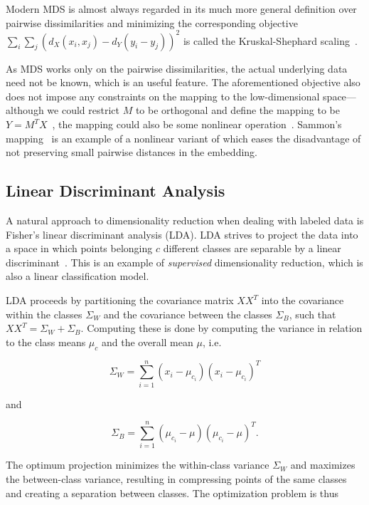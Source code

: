 Modern MDS is almost always regarded in its much more general definition over
pairwise dissimilarities and minimizing the corresponding objective $\sum_i \sum_j
(d_X (x_i, x_j) - d_Y (y_i - y_j))^2$ is called the Kruskal-Shephard scaling~\cite{linearsurvey,kruskal_mds}.

As MDS works only on the pairwise dissimilarities, the actual underlying data need not
be known, which is an useful feature. The aforementioned objective also does not impose
any constraints on the mapping to the low-dimensional space---although we could restrict $M$
to be orthogonal and define the mapping to be $Y = M^TX$~\cite{borg_groenen_mds, cox_mds}, the
mapping could also be some nonlinear operation~\cite{linearsurvey}. Sammon's mapping~\cite{sammon_mapping}
is an example of a nonlinear variant of which eases the disadvantage of not preserving small
pairwise distances in the embedding.

\subsection{Linear Discriminant Analysis}

A natural approach to dimensionality reduction when dealing with labeled data is Fisher's linear discriminant analysis (LDA).
LDA strives to project the data into a space in which points belonging $c$ different classes
are separable by a linear discriminant~\cite{bishop}. This is an example of \emph{supervised} dimensionality reduction,
which is also a linear classification model.

LDA proceeds by partitioning the covariance matrix $XX^T$ into the covariance within the classes $\Sigma_W$
and the covariance between the classes $\Sigma_B$, such that $XX^T = \Sigma_W + \Sigma_B$. Computing these
is done by computing the variance in relation to the class means $\mu_c$ and the overall mean $\mu$, i.e.

\begin{equation}
    \Sigma_W = \sum_{i=1}^{n} (x_i - \mu_{c_i})(x_i - \mu_{c_i})^T
\end{equation}

and

\begin{equation}
    \Sigma_B = \sum_{i=1}^{n} (\mu_{c_i} - \mu)(\mu_{c_i} - \mu)^T.
\end{equation}

The optimum projection minimizes the within-class variance $\Sigma_W$ and maximizes the
between-class variance, resulting in compressing points of the same classes and creating
a separation between classes. The optimization problem is thus

